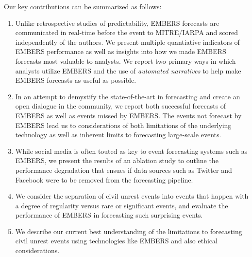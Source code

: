 Our key contributions can be summarized as follows:
\begin{enumerate}
\item Unlike retrospective studies of predictability, EMBERS forecasts are communicated in real-time before the
event to MITRE/IARPA and scored independently of the authors. 
We present multiple quantiative indicators of EMBERS performance 
as well as insights into how
we made EMBERS forecasts most valuable to analysts. We report two primary
ways in which analysts utilize EMBERS and the use of {\it automated
narratives} to help make EMBERS forecasts as useful as possible.

\item In an attempt to demystify the state-of-the-art
in forecasting and create an open dialogue in the community, we report both successful
forecasts of EMBERS as well as events missed by EMBERS. The events not forecast by EMBERS lead us to
considerations of both limitations of the underlying technology as well as inherent limits to
forecasting large-scale events.
\item While social media is often touted as key to event forecasting
systems such as EMBERS, we present the results of an ablation study to outline
the performance degradation that ensues if data sources 
such as Twitter and Facebook were to be removed from the forecasting pipeline.
\item We consider the separation of civil unrest events into events
that happen with a degree of regularity versus rare
or significant
events, and evaluate the performance of EMBERS in forecasting such
surprising events.
\item We describe our current best understanding of the limitations to
forecasting civil unrest events using technologies like EMBERS and 
also ethical considerations.
\end{enumerate}

